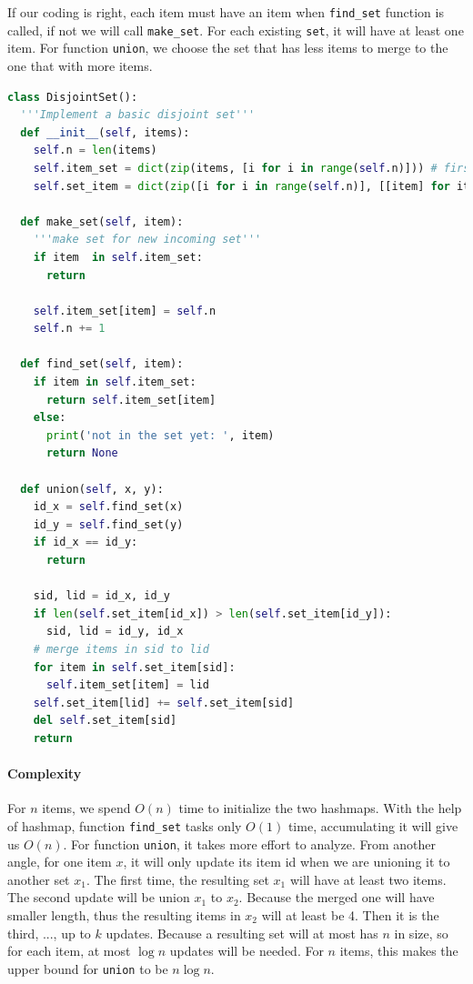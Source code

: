 \documentclass[../main.tex]{subfiles}
\begin{document}
If our coding is right, each item must have an item when \texttt{find\_set} function is called, if not we will call \texttt{make\_set}. For each existing \texttt{set}, it will have at least one item. For function \texttt{union}, we choose the set that has less items to merge to the one that with more items. 

\begin{lstlisting}[language=Python]
class DisjointSet():
  '''Implement a basic disjoint set'''
  def __init__(self, items):
    self.n = len(items)
    self.item_set = dict(zip(items, [i for i in range(self.n)])) # first each set only has one item [i], this can be one->multiple match
    self.set_item = dict(zip([i for i in range(self.n)], [[item] for item in items])) # each item will always belong to one set
    
  def make_set(self, item):
    '''make set for new incoming set'''
    if item  in self.item_set:
      return
    
    self.item_set[item] = self.n
    self.n += 1
    
  def find_set(self, item):
    if item in self.item_set:
      return self.item_set[item]
    else:
      print('not in the set yet: ', item)
      return None
    
  def union(self, x, y):
    id_x = self.find_set(x)
    id_y = self.find_set(y)
    if id_x == id_y:
      return
    
    sid, lid = id_x, id_y
    if len(self.set_item[id_x]) > len(self.set_item[id_y]):
      sid, lid = id_y, id_x
    # merge items in sid to lid 
    for item in self.set_item[sid]:
      self.item_set[item] = lid
    self.set_item[lid] += self.set_item[sid]
    del self.set_item[sid]
    return 
\end{lstlisting}

\paragraph{Complexity} For $n$ items, we spend $O(n)$ time to initialize the two hashmaps. With the help of hashmap, function \texttt{find\_set} tasks only $O(1)$ time, accumulating it will give us $O(n)$. For function \texttt{union}, it takes more effort to analyze. From another angle, for one item $x$, it will only update its item id when we are unioning it to another set $x_1$. The first time, the resulting set $x_1$ will have at least two items. The second update will be union $x_1$ to $x_2$. Because the merged one will have smaller length, thus the resulting items in $x_2$ will at least be 4. Then it is the third, ..., up to $k$ updates. Because a resulting set will at most has $n$ in size, so for each item, at most $\log n$ updates will be needed. For $n$ items, this makes the upper bound for \texttt{union} to be $n\log n$. 
\end{document}
